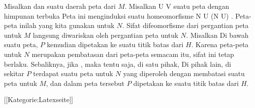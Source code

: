 Misalkan
 dan
 suatu daerah peta dari $M$. Misalkan
\maabbdisp {\alpha} { U } {V
} {}
suatu peta dengan himpunan terbuka
 Peta ini menginduksi suatu homeomorfisme
\maabbdisp {} {N \cap U} { \alpha (N \cap U)
} {.}
Peta-peta inilah yang kita gunakan untuk $N$. Sifat difeomorfisme dari pergantian peta untuk $M$ langsung diwariskan oleh pergantian peta untuk $N$. Misalkan
 Di bawah suatu peta, $P$ kemudian dipetakan ke suatu titik batas dari $H$. Karena peta-peta untuk $N$ merupakan pembatasan dari peta-peta semacam itu, sifat ini tetap berlaku. Sebaliknya, jika
, maka tentu saja, di satu pihak,
 Di pihak lain, di sekitar $P$ terdapat suatu peta untuk $N$ yang diperoleh dengan membatasi suatu peta untuk $M$, dan dalam peta tersebut $P$ dipetakan ke suatu titik batas dari $H$.

 [[Kategorie:Latexseite]]

